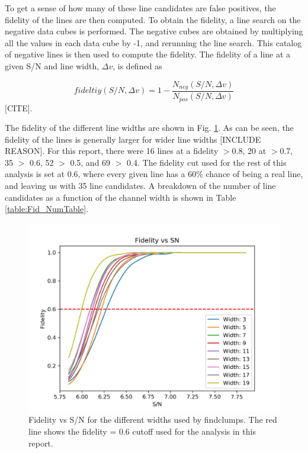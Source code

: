 To get a sense of how many of these line candidates are false positives, the fidelity of the lines are then computed. To obtain the fidelity, a line search on the negative data cubes is performed. The negative cubes are obtained by multiplying all the values in each data cube by -1, and rerunning the line search. This catalog of negative lines is then used to compute the fidelity. The fidelity of a line at a given S/N and line width, $\Delta v$, is defined as 

$$ fideltiy(S/N, \Delta v) = 1 - \frac{N_{neg}(S/N, \Delta v)}{N_{pos}(S/N, \Delta v)} $$ [CITE].

The fidelity of the different line widths are shown in Fig. \ref{fig:Fid_map}. As can be seen, the fidelity of the lines is generally larger for wider line widths [INCLUDE REASON]. For this report, there were 16 lines at a fidelity $>$0.8, 20 at $>$0.7, 35 $>$ 0.6, 52 $>$ 0.5, and 69 $>$ 0.4. The fidelity cut used for the rest of this analysis is set at 0.6, where every given line has a 60\% chance of being a real line, and leaving us with 35 line candidates. A breakdown of the number of line candidates as a function of the channel width is shown in Table \ref{table:Fid_NumTable}. 

\begin{figure}[tbp]
\centering \includegraphics[width=120mm]{Fidelity_map.png}
\caption{Fidelity vs S/N for the different widths used by findclumps. The red line shows the fidelity = 0.6 cutoff used for the analysis in this report.}
\label{fig:Fid_map}
\end{figure}

